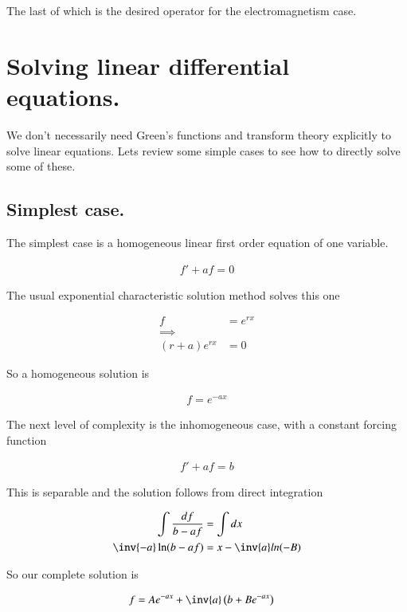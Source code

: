The last of which is the desired operator for the electromagnetism case.

\section{Solving linear differential equations. }

We don't necessarily need Green's functions and transform theory explicitly to solve linear equations.  Lets review some simple cases to see how to directly solve some of these.

\subsection{Simplest case. }

The simplest case is a homogeneous linear first order equation of one variable.

\begin{align*}
f' + a f = 0
\end{align*}

The usual exponential characteristic solution method solves this one

\begin{align*}
f &= e^{rx} \\
\implies \\
(r + a) e^{rx} &= 0
\end{align*}

So a homogeneous solution is

\begin{align*}
f = e^{-ax}
\end{align*}

The next level of complexity is the inhomogeneous case, with a constant forcing function

\begin{align*}
f' + a f = b
\end{align*}

This is separable and the solution follows from direct integration

\begin{align*}
\int \frac{df}{b - a f} &= \int dx \\
\inv{-a}\ln(b - af) &= x - \inv{a} ln(-B) \\
\end{align*}

So our complete solution is

\begin{align*}
f &= A e^{-ax} + \inv{a}\left(b + B e^{-a x}\right)
\end{align*}

